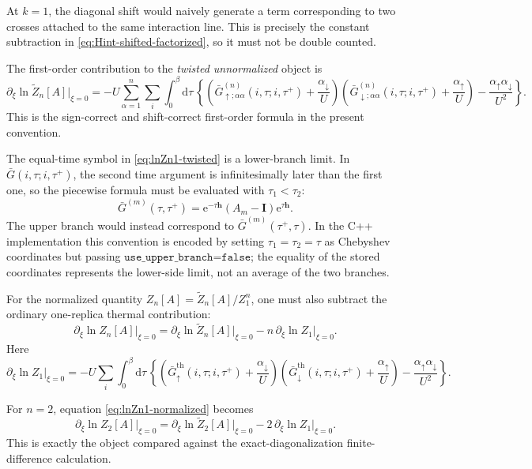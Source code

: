 \documentclass[11pt]{article}
\newcommand{\e}{\mathrm{e}}
\newcommand{\dd}{\mathrm{d}}
\newcommand{\1}{\mathds{1}}
\newcommand{\up}{\uparrow}
\newcommand{\dn}{\downarrow}
\newcommand{\bh}{\bm{h}}
\newcommand{\bI}{\bm{I}}
\newcommand{\br}[1]{\left(#1\right)}
\newcommand{\cb}[1]{\left\{#1\right\}}
\begin{document}
At $k=1$, the diagonal shift would naively generate a term corresponding to
two crosses attached to the same interaction line. This is precisely the
constant subtraction in \eqref{eq:Hint-shifted-factorized}, so it must not be
double counted.

The first-order contribution to the \emph{twisted unnormalized} object is
\begin{equation}
\boxed{
\partial_\xi \ln \widetilde Z_n[A]\Big|_{\xi=0}
=
-U
\sum_{\alpha=1}^n
\sum_i
\int_0^\beta \dd\tau\,
\cb{
\br{
\bar G_{\up;\alpha\alpha}^{(n)}(i,\tau;i,\tau^+)
+\frac{\alpha_\dn}{U}
}
\br{
\bar G_{\dn;\alpha\alpha}^{(n)}(i,\tau;i,\tau^+)
+\frac{\alpha_\up}{U}
}
-
\frac{\alpha_\up\alpha_\dn}{U^2}
}.
}
\label{eq:lnZn1-twisted}
\end{equation}
This is the sign-correct and shift-correct first-order formula in the present
convention.

The equal-time symbol in \eqref{eq:lnZn1-twisted} is a lower-branch limit.
In \(\bar G(i,\tau;i,\tau^+)\), the second time argument is infinitesimally
later than the first one, so the piecewise formula must be evaluated with
\(\tau_1<\tau_2\):
\[
  \bar G^{(m)}(\tau,\tau^+)
  =
  \e^{-\tau\bh}\br{A_m-\bI}\e^{\tau\bh}.
\]
The upper branch would instead correspond to
\(\bar G^{(m)}(\tau^+,\tau)\).  In the C++ implementation this convention is
encoded by setting \(\tau_1=\tau_2=\tau\) as Chebyshev coordinates but passing
\(\texttt{use\_upper\_branch=false}\); the equality of the stored coordinates
represents the lower-side limit, not an average of the two branches.

For the normalized quantity $Z_n[A]=\widetilde Z_n[A]/Z_1^n$, one must also
subtract the ordinary one-replica thermal contribution:
\begin{equation}
\boxed{
\partial_\xi \ln Z_n[A]\Big|_{\xi=0}
=
\partial_\xi \ln \widetilde Z_n[A]\Big|_{\xi=0}
-
n\,\partial_\xi \ln Z_1\Big|_{\xi=0}.
}
\label{eq:lnZn1-normalized}
\end{equation}
Here
\begin{equation}
\partial_\xi \ln Z_1\Big|_{\xi=0}
=
-U
\sum_i
\int_0^\beta \dd\tau\,
\cb{
\br{
\bar G_{\up}^{\mathrm{th}}(i,\tau;i,\tau^+)
+\frac{\alpha_\dn}{U}
}
\br{
\bar G_{\dn}^{\mathrm{th}}(i,\tau;i,\tau^+)
+\frac{\alpha_\up}{U}
}
-
\frac{\alpha_\up\alpha_\dn}{U^2}
}.
\label{eq:lnZ1-first-order}
\end{equation}

For $n=2$, equation \eqref{eq:lnZn1-normalized} becomes
\begin{equation}
\partial_\xi \ln Z_2[A]\Big|_{\xi=0}
=
\partial_\xi \ln \widetilde Z_2[A]\Big|_{\xi=0}
-
2\,\partial_\xi \ln Z_1\Big|_{\xi=0}.
\label{eq:n2-normalized-first-order}
\end{equation}
This is exactly the object compared against the exact-diagonalization
finite-difference calculation.
\end{document}
